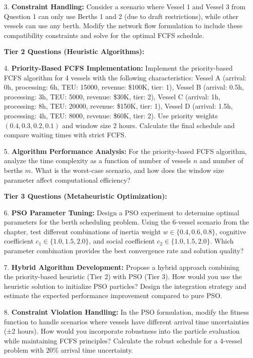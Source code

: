 \documentclass{article}
\begin{document}
3. \textbf{Constraint Handling:} Consider a scenario where Vessel 1 and Vessel 3 from Question 1 can only use Berths 1 and 2 (due to draft restrictions), while other vessels can use any berth. Modify the network flow formulation to include these compatibility constraints and solve for the optimal FCFS schedule.

\textbf{Tier 2 Questions (Heuristic Algorithms):}

4. \textbf{Priority-Based FCFS Implementation:} Implement the priority-based FCFS algorithm for 4 vessels with the following characteristics: Vessel A (arrival: 0h, processing: 6h, TEU: 15000, revenue: \$100K, tier: 1), Vessel B (arrival: 0.5h, processing: 3h, TEU: 5000, revenue: \$30K, tier: 2), Vessel C (arrival: 1h, processing: 8h, TEU: 20000, revenue: \$150K, tier: 1), Vessel D (arrival: 1.5h, processing: 4h, TEU: 8000, revenue: \$60K, tier: 2). Use priority weights $(0.4, 0.3, 0.2, 0.1)$ and window size 2 hours. Calculate the final schedule and compare waiting times with strict FCFS.

5. \textbf{Algorithm Performance Analysis:} For the priority-based FCFS algorithm, analyze the time complexity as a function of number of vessels $n$ and number of berths $m$. What is the worst-case scenario, and how does the window size parameter affect computational efficiency?

\textbf{Tier 3 Questions (Metaheuristic Optimization):}

6. \textbf{PSO Parameter Tuning:} Design a PSO experiment to determine optimal parameters for the berth scheduling problem. Using the 6-vessel scenario from the chapter, test different combinations of inertia weight $w \in \{0.4, 0.6, 0.8\}$, cognitive coefficient $c_1 \in \{1.0, 1.5, 2.0\}$, and social coefficient $c_2 \in \{1.0, 1.5, 2.0\}$. Which parameter combination provides the best convergence rate and solution quality?

7. \textbf{Hybrid Algorithm Development:} Propose a hybrid approach combining the priority-based heuristic (Tier 2) with PSO (Tier 3). How would you use the heuristic solution to initialize PSO particles? Design the integration strategy and estimate the expected performance improvement compared to pure PSO.

8. \textbf{Constraint Violation Handling:} In the PSO formulation, modify the fitness function to handle scenarios where vessels have different arrival time uncertainties (±2 hours). How would you incorporate robustness into the particle evaluation while maintaining FCFS principles? Calculate the robust schedule for a 4-vessel problem with 20\% arrival time uncertainty.
\end{document}
